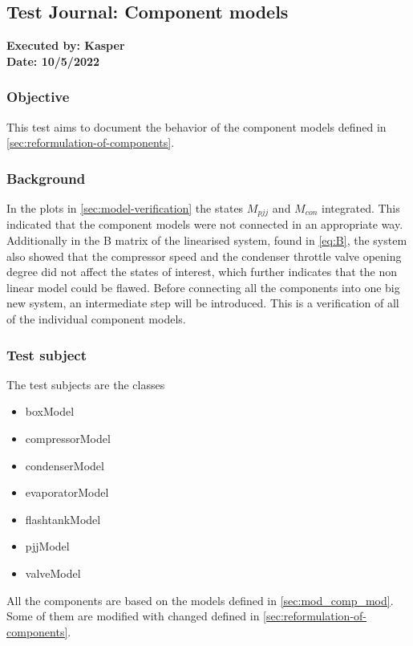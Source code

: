 \subsection{Test Journal: Component models} \label{app:tj_0}

\textbf{Executed by: Kasper} \\
\textbf{Date: 10/5/2022}

\subsubsection*{Objective}
This test aims to document the behavior of the component models defined in \cref{sec:reformulation-of-components}.

\subsubsection*{Background}
In the plots in \cref{sec:model-verification} the states $ M_{pjj} $ and $ M_{con} $ integrated. This indicated that the component models were not connected in an appropriate way.
Additionally in the B matrix of the linearised system, found in \cref{eq:B}, the system also showed that the compressor speed and the condenser throttle valve opening degree did not affect the states of interest, which further indicates that the non linear model could be flawed.
Before connecting all the components into one big new system, an intermediate step will be introduced. This is a verification of all of the individual component models.


\subsubsection*{Test subject}
The test subjects are the classes
\begin{itemize}
	\item boxModel
	\item compressorModel
	\item condenserModel
	\item evaporatorModel
	\item flashtankModel
	\item pjjModel
	\item valveModel
\end{itemize}
All the components are based on the models defined in \cref{sec:mod_comp_mod}. Some of them are modified with changed defined in \cref{sec:reformulation-of-components}.\\

